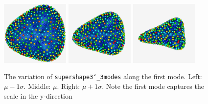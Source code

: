 \documentclass[letterpaper,12pt]{article}   %
\begin{document}
\vspace{0.1in}
\begin{figure}[!htp]
\centering
\includegraphics[width=0.3\textwidth]{figs/supershapes_3mode_mod1_neg1std.png}
\includegraphics[width=0.3\textwidth]{figs/supershapes_3mode_mod1_0std.png}
\includegraphics[width=0.3\textwidth]{figs/supershapes_3mode_mod1_1std.png}
\caption{The variation of \texttt{supershape3\char`_3modes} along the first mode. Left: $\mu - 1\sigma$. Middle: $\mu$. Right: $\mu + 1\sigma$. Note the first mode captures the scale in the y-direction}
\label{fig:supershape_3modes_mod1}
\end{figure}
\end{document}
